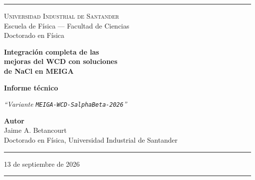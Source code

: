 \documentclass[11pt,a4paper]{article}
\begin{document}
\pagestyle{empty}


\begin{titlepage}
\begin{center}

\vspace*{0.5cm}
\textcolor{reglaColor}{\rule{\linewidth}{1.2pt}}

\vspace{1.3cm}
{\Large\scshape Universidad Industrial de Santander}\\[0.2cm]
{\large Escuela de Física --- Facultad de Ciencias}\\[0.2cm]
{\large Doctorado en Física}

\vspace{2.2cm}
{\Huge\bfseries\color{tituloColor} Integración completa de las\\[0.2cm]
mejoras del WCD con soluciones\\[0.2cm] de NaCl en MEIGA}

\vspace{1.8cm}
{\large\textbf{Informe técnico}}

\vspace{0.6cm}
\begin{minipage}{0.82\linewidth}
\centering
\textit{``Variante \texttt{MEIGA-WCD-SalphaBeta-2026}''}
\end{minipage}

\vfill

{\large\textbf{Autor}}\\[0.15cm]
Jaime A. Betancourt\\[0.1cm]
Doctorado en Física, Universidad Industrial de Santander

\vspace{1.2cm}
\textcolor{reglaColor}{\rule{0.5\linewidth}{0.6pt}}

\vspace{1cm}
13 de septiembre de 2026

\vspace{1cm}
\textcolor{reglaColor}{\rule{\linewidth}{1.2pt}}

\end{center}
\end{titlepage}

\pagestyle{plain}
\end{document}
